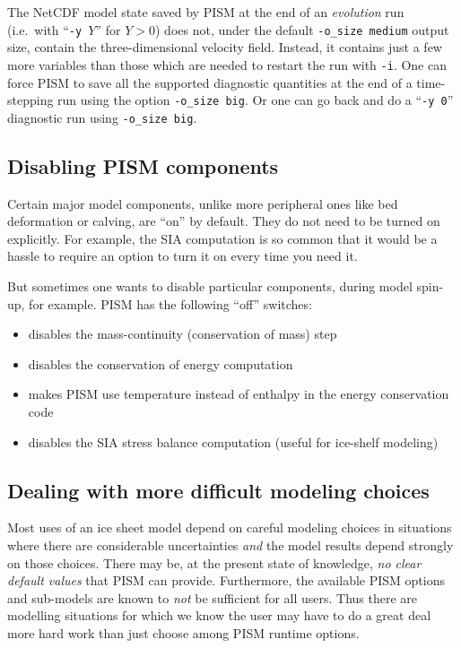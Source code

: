 The NetCDF model state saved by PISM at the end of an \emph{evolution} run (i.e.~with ``\texttt{-y }$Y$'' for $Y>0$) does not, under the default \texttt{-o_size medium} output size, contain the three-dimensional velocity field.  Instead, it contains just a few more variables than those which are needed to restart the run with \texttt{-i}.  One can  force PISM to save all the supported diagnostic quantities at the end of a time-stepping run using the option \texttt{-o_size big}.  Or one can go back and do a ``\texttt{-y 0}'' diagnostic run using \texttt{-o_size big}.


\subsection{Disabling PISM components}
\label{sec:turning-off}

Certain major model components, unlike more peripheral ones like bed deformation or calving, are ``on'' by default.  They do not need to be turned on explicitly.  For example, the SIA computation is so common that it would be a hassle to require an option to turn it on every time you need it.

But sometimes one wants to disable particular components, during model spin-up, for example.  PISM has the following ``off'' switches:
\begin{itemize}
\item {} disables the mass-continuity (conservation of mass) step
\item {} disables the conservation of energy computation
\item {} makes PISM use temperature instead of enthalpy in the energy conservation code
\item {} disables the SIA stress balance computation (useful for ice-shelf modeling)
\end{itemize}


\subsection{Dealing with more difficult modeling choices}
\label{subsec:hard-choices}

Most uses of an ice sheet model depend on careful modeling choices in situations where there are considerable uncertainties \emph{and} the model results depend strongly on those choices.  There may be, at the present state of knowledge, \emph{no clear default values} that PISM can provide.  Furthermore, the available PISM options and sub-models are known to \emph{not} be sufficient for all users.  Thus there are modelling situations for which we know the user may have to do a great deal more hard work than just choose among PISM runtime options.

